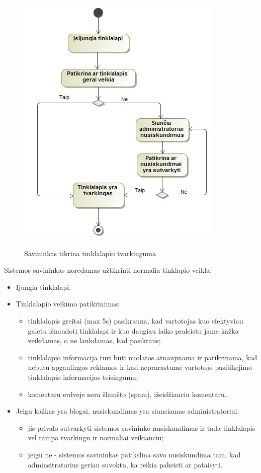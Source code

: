﻿\documentclass{VUMIFPSkursinis}
\begin{document}
\begin{figure}[H]
    \centering
    \includegraphics[scale=0.7]{img/geri/sistemosSav}
    \label{img:uml13}
	\caption{Savininkas tikrina tinklalapio tvarkinguma}
\end{figure}

Sistemos savininkas noredamas užtikrinti normalia tinklapio veikla:
\begin{itemize}
\item Ijungia tinklalapi.
\item Tinklalapio veikimo patikrinimas: 
\begin{itemize}
\item tinklalapis greitai (max 5s) pasikrauna, kad vartotojas kuo efektyviau galetu išnaudoti tinklalapi ir kuo daugiau laiko praleistu jame kažka veikdamas, o ne laukdamas, kad pasikraus;
\item tinklalapio informacija turi buti nuolatos atnaujinama ir patikrinama, kad nebutu apgaulingos reklamos ir kad neprarastume vartotojo pasitikejimo tinklalapio informacijos teisingumu;
\item komentaru erdveje nera šlamšto (spam), ižeidžianciu komentaru.
\end{itemize}
\item Jeigu kažkas yra blogai, nusiskundimas yra siunciamas administratoriui: 
\begin{itemize}
\item jis privalo sutvarkyti sistemos savininko nusiskundimus ir tada tinklalapis vel tampa tvarkingu ir normaliai veikianciu;
\item jeigu ne - sistemos savininkas patikslina savo nusiskundima tam, kad adminsitratorius geriau suvoktu, ka reikia pakeisti ar pataisyti.
\end{itemize}
\end{itemize}
\end{document}
